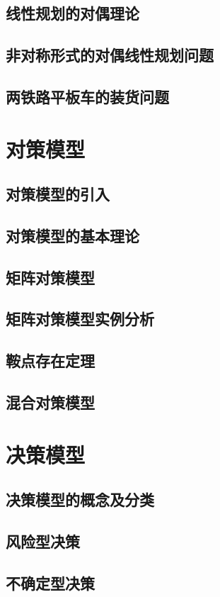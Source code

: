 \documentclass[openany]{progbookcn}
\begin{document}
\section{线性规划的对偶理论}
\section{非对称形式的对偶线性规划问题}
\section{两铁路平板车的装货问题}

\chapter{对策模型}
\section{对策模型的引入}
\section{对策模型的基本理论}
\section{矩阵对策模型}
\section{矩阵对策模型实例分析}
\section{鞍点存在定理}
\section{混合对策模型}

\chapter{决策模型}
\section{决策模型的概念及分类}
\section{风险型决策}
\section{不确定型决策}
\end{document}
